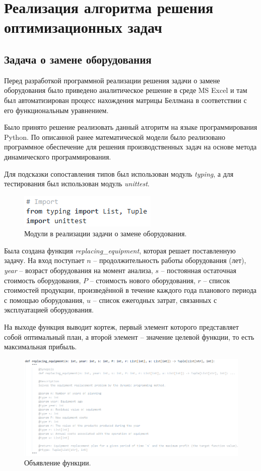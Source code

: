 \section{Реализация алгоритма решения оптимизационных задач}


\subsection{Задача о замене оборудования}

\indent Перед разработкой программной реализации решения задачи о замене оборудования было приведено аналитическое решение в среде MS Excel и там был автоматизирован процесс нахождения матрицы Беллмана в соответствии с его функциональным уравнением. 

Было принято решение реализовать данный алгоритм на языке программирования Python. По описанной ранее математической модели было реализовано программное обеспечение для решения производственных задач на основе метода динамического программирования. 

Для подсказки сопоставления типов был использован модуль \textit{typing}, а для тестирования был использован модуль \textit{unittest}.
\begin{figure}[h]
  \centering \includegraphics[scale=1]{content/images/impl_equipment1.png}
  \caption{Модули в реализации задачи о замене оборудования.}
  \label{fig:impl_equipment1}
\end{figure}

Была создана функция \textit{replacing\_equipment}, которая решает поставленную задачу. На вход поступает $n$ -- продолжительность работы оборудования (лет), \textit{year} -- возраст оборудования на момент анализа, $s$ -- постоянная остаточная стоимость оборудования, $P$ -- стоимость нового оборудования, $r$ -- список стоимостей продукции, произведённой в течение каждого года планового периода с помощью оборудования,  $u$ -- список ежегодных затрат, связанных с эксплуатацией оборудования.

На выходе функция выводит кортеж, первый элемент которого представляет собой оптимальный план, а второй элемент -- значение целевой функции, то есть максимальная прибыль.
\begin{figure}[h]
  \centering \includegraphics[scale=0.6]{content/images/impl_equipment2.png}
  \caption{Объявление функции.}
  \label{fig:impl_equipment2}
\end{figure}

